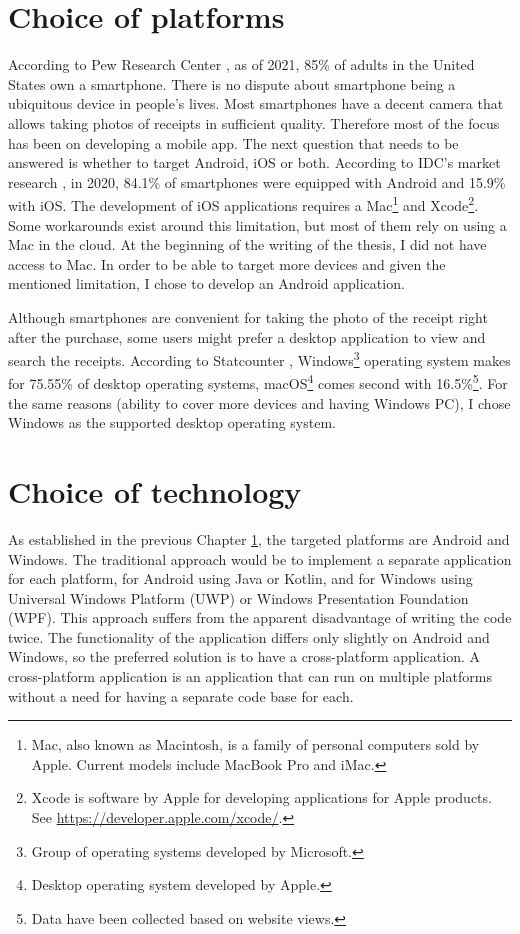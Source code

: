 \documentclass[
  digital, %
  table,   %
  oneside, %
  lof,     %
  lot,     %
]{fithesis3}
\begin{document}
\chapter{Choice of platforms}
\label{chap:choice_of_platforms}
According to Pew Research Center \cite{PewResearchCenter2021Mobile}, as of 2021, 85\% of adults in the United States own a smartphone. There is no dispute about smartphone being a ubiquitous device in people's lives. 
Most smartphones have a decent camera that allows taking photos of receipts in sufficient quality. Therefore most of the focus has been on developing a mobile app.
The next question that needs to be answered is whether to target Android, iOS or both. According to IDC's market research \cite{Idc2021Smartphone}, in 2020, 84.1\% of smartphones were equipped with Android and 15.9\% with iOS. The development of iOS applications requires a Mac\footnote{Mac, also known as Macintosh, is a family of personal computers sold by Apple. Current models include MacBook Pro and iMac.} and Xcode\footnote{Xcode is software by Apple for developing applications for Apple products. See \url{https://developer.apple.com/xcode/}.}. Some workarounds exist around this limitation, but most of them rely on using a Mac in the cloud. At the beginning of the writing of the thesis, I did not have access to Mac. In order to be able to target more devices and given the mentioned limitation, I chose to develop an Android application.

Although smartphones are convenient for taking the photo of the receipt right after the purchase, some users might prefer a desktop application to view and search the receipts.
According to Statcounter \cite{Statcounter2021Desktop}, Windows\footnote{Group of operating systems developed by Microsoft.} operating system makes for 75.55\% of desktop operating systems, macOS\footnote{Desktop operating system developed by Apple.} comes second with 16.5\%\footnote{Data have been collected based on website views.}.
For the same reasons (ability to cover more devices and having Windows PC), I chose Windows as the supported desktop operating system.

\chapter{Choice of technology}
As established in the previous Chapter \ref{chap:choice_of_platforms}, the targeted platforms are Android and Windows. The traditional approach would be to implement a separate application for each platform, for Android using Java or Kotlin, and for Windows using Universal Windows Platform (UWP) or Windows Presentation Foundation (WPF). This approach suffers from the apparent disadvantage of writing the code twice. The functionality of the application differs only slightly on Android and Windows, so the preferred solution is to have a cross-platform application. A cross-platform application is an application that can run on multiple platforms without a need for having a separate code base for each.
\end{document}
